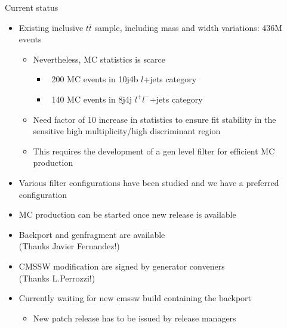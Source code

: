 \documentclass[xcolor=table]{beamer}
\begin{document}
\begin{frame}{Current status}

\begin{itemize}
\item Existing inclusive $t\bar{t}$ sample, including mass and width variations: 436M events
\begin{itemize}
\item Nevertheless, MC statistics is scarce
\begin{itemize}
\item ~200 MC events in 10j4b $l$+jets category
\item ~140 MC events in 8j4j $l^+l^-$+jets category
\end{itemize} 
\item Need factor of 10 increase in statistics to ensure fit stability in the sensitive high multiplicity/high discriminant region
\item This requires the development of a gen level filter for efficient MC production
\end{itemize}
\end{itemize}
\begin{itemize}
\item Various filter configurations have been studied and we have a preferred configuration
\end{itemize}
\begin{itemize}
\item MC production can be started once new release is available
\item Backport and genfragment are available \\(Thanks Javier Fernandez!)
\item CMSSW modification are signed by generator conveners \\(Thanks L.Perrozzi!)
\item Currently waiting for new cmssw build containing the backport
\begin{itemize}
\item New patch release has to be issued by release managers
\end{itemize}
\end{itemize}
\end{frame}
\end{document}
